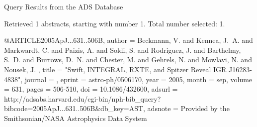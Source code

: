 Query Results from the ADS Database


Retrieved 1 abstracts, starting with number 1.  Total number selected: 1.

@ARTICLE{2005ApJ...631..506B,
   author = {{Beckmann}, V. and {Kennea}, J.~A. and {Markwardt}, C. and {Paizis}, A. and 
	{Soldi}, S. and {Rodriguez}, J. and {Barthelmy}, S.~D. and {Burrows}, D.~N. and 
	{Chester}, M. and {Gehrels}, N. and {Mowlavi}, N. and {Nousek}, J.
	},
    title = "{Swift, INTEGRAL, RXTE, and Spitzer Reveal IGR J16283-4838}",
  journal = {\apj},
   eprint = {astro-ph/0506170},
     year = 2005,
    month = sep,
   volume = 631,
    pages = {506-510},
      doi = {10.1086/432600},
   adsurl = {http://adsabs.harvard.edu/cgi-bin/nph-bib_query?bibcode=2005ApJ...631..506B&db_key=AST},
  adsnote = {Provided by the Smithsonian/NASA Astrophysics Data System}
}


